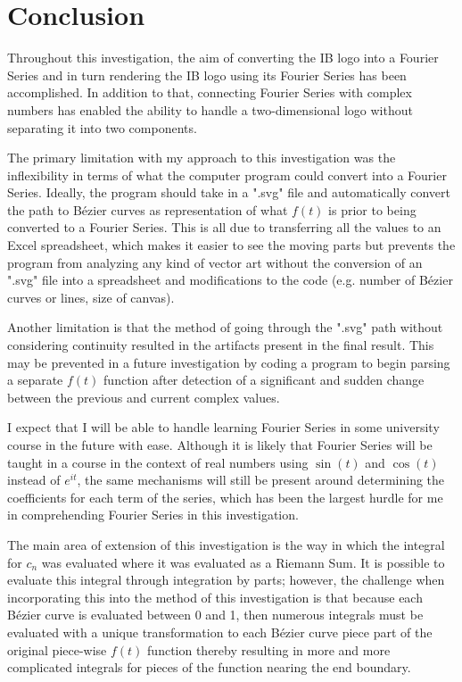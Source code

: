 \documentclass[letterpaper, 12pt]{article}
\begin{document}
\section{Conclusion}

Throughout this investigation, the aim of converting
the IB logo into a Fourier Series and in turn
rendering the IB logo using its Fourier Series has been
accomplished. In addition to that, connecting
Fourier Series with complex numbers has enabled
the ability to handle a two-dimensional
logo without separating it into two components.

The primary limitation with my approach to this investigation
was the inflexibility in terms of what the
computer program could convert into a Fourier Series.
Ideally, the program should take in a ".svg" file and
automatically convert the path to Bézier curves
as representation of what \(f(t)\) is
prior to being converted to a Fourier Series.
This is all due to transferring all the values
to an Excel spreadsheet, which makes it easier to
see the moving parts but prevents the program
from analyzing any kind of vector art
without the conversion of an ".svg" file into
a spreadsheet and modifications to the code
(e.g. number of Bézier curves or lines, size of canvas).

Another limitation is that the method of
going through the ".svg" path without
considering continuity resulted in the artifacts present
in the final result. This may be
prevented in a future investigation
by coding a program to begin
parsing a separate \(f(t)\) function
after detection of a significant and sudden
change between the previous and current
complex values.

I expect that I will be able to handle learning
Fourier Series in some university course
in the future with ease. Although it is likely
that Fourier Series will be taught in a course
in the context of real numbers using
\(\sin(t)\) and \(\cos(t)\) instead of \(e^{it}\),
the same mechanisms will still be present around
determining the coefficients for each term of
the series, which has been the largest hurdle
for me in comprehending Fourier Series in this
investigation.

The main area of extension of this investigation
is the way in which the integral for \(c_n\) was
evaluated where it was evaluated as a Riemann Sum.
It is possible to evaluate this integral through
integration by parts; however, the challenge
when incorporating this into the method of this investigation
is that because each Bézier curve is evaluated
between 0 and 1, then numerous integrals
must be evaluated with a unique transformation
to each Bézier curve piece part of the original
piece-wise \(f(t)\) function thereby resulting
in more and more complicated integrals
for pieces of the function nearing the end boundary.
\end{document}
